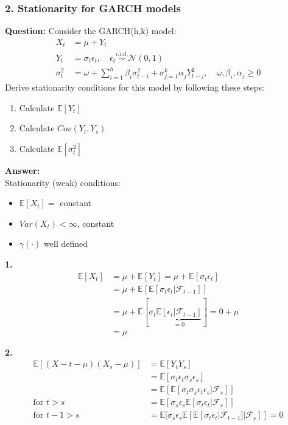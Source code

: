 \begin{footnotesize}

\subsubsection*{2. Stationarity for GARCH models}

\textbf{Question:} Consider the GARCH(h,k) model:
\begin{align*}
    X_t &= \mu+Y_t \\
    Y_t &= \sigma_t \epsilon_t, \quad \epsilon_t \overset{i.i.d.}{\sim} \mathcal{N}(0,1) \\
    \sigma^2_t &= \omega + \sum_{i=1}^h \beta_i \sigma_{t-i}^2 + \sigma_{j=1}^k \alpha_j Y_{t-j}^2, \quad \omega,\beta_i, \alpha_j \geq 0
\end{align*}
Derive stationarity conditions for this model by following these steps:
\begin{enumerate}
    \item Calculate $\mathbb{E}[Y_t]$
    \item Calculate $Cov(Y_t,Y_s)$
    \item Calculate $\mathbb{E}[\sigma_t^2]$
\end{enumerate}
\textbf{Answer:} \\

Stationarity (weak) conditions:
\begin{itemize}
    \item $\mathbb{E}[X_t] =$ constant
    \item $Var(X_t) < \infty$, constant
    \item $\gamma(\cdot)$ well defined
\end{itemize}

\textbf{1.}
\begin{align*}
    \mathbb{E}[X_t] &= \mu + \mathbb{E}[Y_t] = \mu + \mathbb{E}[\sigma_t \epsilon_t] \\ &= \mu+ \mathbb{E}[\mathbb{E}[\sigma_t \epsilon_t | \mathcal{F}_{t-1}]]\\
    &= \mu + \mathbb{E}[\sigma_t \underbrace{\mathbb{E}[\epsilon_t|\mathcal{F}_{t-1}]}_{=0}] = 0 + \mu\\ &= \mu
\end{align*}

\textbf{2.}
\begin{align*}
    \mathbb{E}[(X-t -\mu)(X_s-\mu)] &= \mathbb{E}[Y_t Y_s]\\
    &=\mathbb{E}[\sigma_t \epsilon_t \sigma_s \epsilon_s]\\
    &= \mathbb{E}[\mathbb{E}[ \sigma_t \sigma_s \epsilon_t \epsilon_s | \mathcal{F}_s]] \\
    \text{for $t>s$ } &= \mathbb{E}[\sigma_s \epsilon_s \mathbb{E}[\sigma_t\epsilon_t|\mathcal{F}_s]] \\
    \text{for $t-1 > s$ } &= \mathbb{E}[\sigma_s \epsilon_s \mathbb{E}[ \mathbb{E}[\sigma_t \epsilon_t|\mathcal{F}_{t-1} ]|\mathcal{F}_s]] = 0
\end{align*}


\end{footnotesize}
